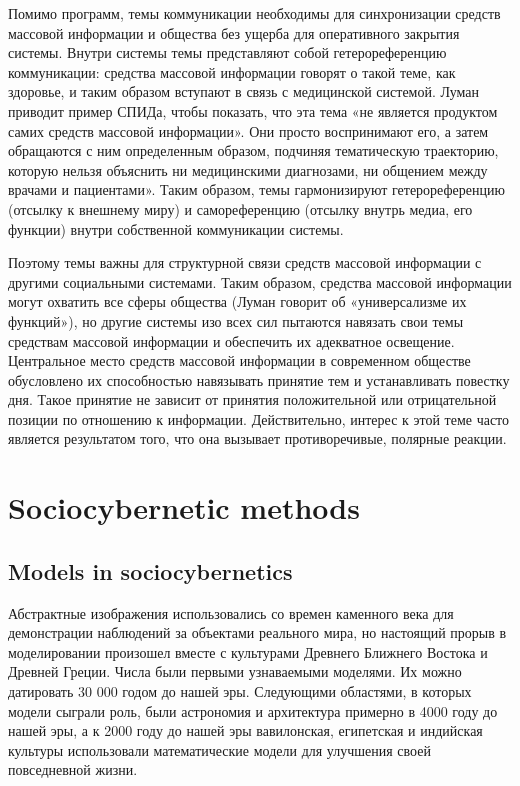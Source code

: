 \documentclass[a4page]{article}
\begin{document}
Помимо программ, темы коммуникации необходимы для синхронизации средств массовой информации и общества без ущерба для оперативного закрытия системы. Внутри системы темы представляют собой гетерореференцию коммуникации: средства массовой информации говорят о такой теме, как здоровье, и таким образом вступают в связь с медицинской системой. Луман приводит пример СПИДа, чтобы показать, что эта тема «не является продуктом самих средств массовой информации». Они просто воспринимают его, а затем обращаются с ним определенным образом, подчиняя тематическую траекторию, которую нельзя объяснить ни медицинскими диагнозами, ни общением между врачами и пациентами»\cite{reality_of_mass_media}. Таким образом, темы гармонизируют гетерореференцию (отсылку к внешнему миру) и самореференцию (отсылку внутрь медиа, его функции) внутри собственной коммуникации системы.

Поэтому темы важны для структурной связи средств массовой информации с другими социальными системами. Таким образом, средства массовой информации могут охватить все сферы общества (Луман говорит об «универсализме их функций»), но другие системы изо всех сил пытаются навязать свои темы средствам массовой информации и обеспечить их адекватное освещение. Центральное место средств массовой информации в современном обществе обусловлено их способностью навязывать принятие тем и устанавливать повестку дня. Такое принятие не зависит от принятия положительной или отрицательной позиции по отношению к информации. Действительно, интерес к этой теме часто является результатом того, что она вызывает противоречивые, полярные реакции.

\section{Sociocybernetic methods}

\subsection{Models in sociocybernetics}
Абстрактные изображения использовались со времен каменного века для демонстрации наблюдений за объектами реального мира, но настоящий прорыв в моделировании произошел вместе с культурами Древнего Ближнего Востока и Древней Греции. Числа были первыми узнаваемыми моделями. Их можно датировать 30 000 годом до нашей эры. Следующими областями, в которых модели сыграли роль, были астрономия и архитектура примерно в 4000 году до нашей эры, а к 2000 году до нашей эры вавилонская, египетская и индийская культуры использовали математические модели для улучшения своей повседневной жизни.
\end{document}
